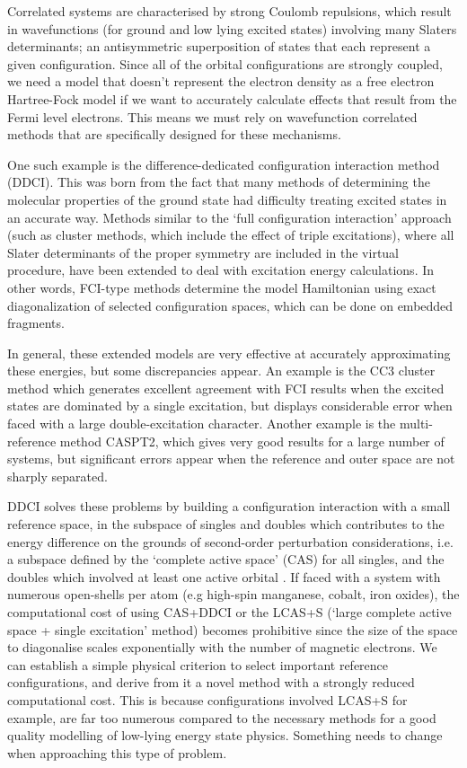 \documentclass[10pt]{article}
\begin{document}
Correlated systems are characterised by strong Coulomb repulsions, which result in wavefunctions (for ground and low lying excited states) involving many Slaters determinants; an antisymmetric superposition of states that each represent a given configuration. Since all of the orbital configurations are strongly coupled, we need a model that doesn't represent the electron density as a free electron Hartree-Fock model if we want to accurately calculate effects that result from the Fermi level electrons. This means we must rely on wavefunction correlated methods that are specifically designed for these mechanisms. 

One such example is the difference-dedicated configuration interaction method (DDCI). This was born from the fact that many methods of determining the molecular properties of the ground state had difficulty treating excited states in an accurate way. Methods similar to the `full configuration interaction' approach (such as cluster methods, which include the effect of triple excitations), where all Slater determinants of the proper symmetry are included in the virtual procedure, have been extended to deal with excitation energy calculations. In other words, FCI-type methods determine the model Hamiltonian using exact diagonalization of selected configuration spaces, which can be done on embedded fragments.

In general, these extended models are very effective at accurately approximating these energies, but some discrepancies appear. An example is the CC3 cluster method which generates excellent agreement with FCI results when the excited states are dominated by a single excitation, but displays considerable error when faced with a large double-excitation character. Another example is the multi-reference method CASPT2, which gives very good results for a large number of systems, but significant errors appear when the reference and outer space are not sharply separated.

DDCI solves these problems by building a configuration interaction with a small reference space, in the subspace of singles and doubles which contributes to the energy difference on the grounds of second-order perturbation considerations, i.e. a subspace defined by the `complete active space' (CAS) for all singles, and the doubles which involved at least one active orbital \cite{garcia1997application}. If faced with a system with numerous open-shells per atom (e.g high-spin manganese, cobalt, iron oxides), the computational cost of using CAS+DDCI or the LCAS+S (`large complete active space + single excitation' method) becomes prohibitive since the size of the space to diagonalise scales exponentially with the number of magnetic electrons. We can establish a simple physical criterion to select important reference configurations, and derive from it a novel method with a strongly reduced computational cost. This is because configurations involved LCAS+S for example, are far too numerous compared to the necessary methods for a good quality modelling of low-lying energy state physics. Something needs to change when approaching this type of problem.
\end{document}
